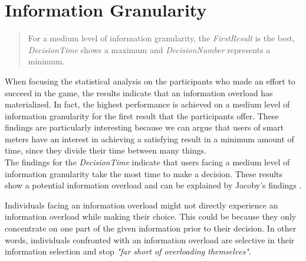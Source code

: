 \section{Information Granularity}
\begin{quote}
For a medium level of information granularity, the \textit{FirstResult} is the best, \textit{DecisionTime} shows a maximum and \textit{DecisionNumber} represents a minimum.
\end{quote}
When focusing the statistical analysis on the participants who made an effort to succeed in the game, the results indicate that an information overload has materialized. In fact, the highest performance is achieved on a medium level of information granularity for the first result that the participants offer. These findings are particularly interesting because we can argue that users of smart meters have an interest in achieving a satisfying result in a minimum amount of time, since they divide their time between many things.\\
The findings for the \textit{DecisionTime} indicate that users facing a medium level of information granularity take the most time to make a decision. These results show a potential information overload and can be explained by Jacoby's findings  \citep{Jacoby1984}.
 
Individuals facing an information overload might not directly experience an information overload while making their choice. This could be because they only concentrate on one part of the given information prior to their decision. In other words, individuals confronted with an information overload are selective in their information selection and stop \textit{"far short of overloading themselves"}.

